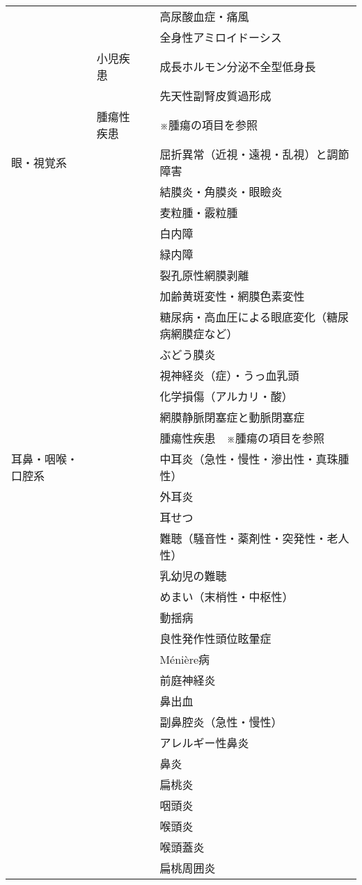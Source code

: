 \begin{xltabular}{\linewidth}{XXXX}
 &  &  & 高尿酸血症・痛風 \\
 &  &  & 全身性アミロイドーシス \\
 & 小児疾患 &  & 成長ホルモン分泌不全型低身長 \\
 &  &  & 先天性副腎皮質過形成 \\
 & 腫瘍性疾患 &  & ※腫瘍の項目を参照 \\
眼・視覚系 &  &  & 屈折異常（近視・遠視・乱視）と調節障害 \\
 &  &  & 結膜炎・角膜炎・眼瞼炎 \\
 &  &  & 麦粒腫・霰粒腫 \\
 &  &  & 白内障 \\
 &  &  & 緑内障 \\
 &  &  & 裂孔原性網膜剥離 \\
 &  &  & 加齢黄斑変性・網膜色素変性 \\
 &  &  & 糖尿病・高血圧による眼底変化（糖尿病網膜症など） \\
 &  &  & ぶどう膜炎 \\
 &  &  & 視神経炎（症）・うっ血乳頭 \\
 &  &  & 化学損傷（アルカリ・酸） \\
 &  &  & 網膜静脈閉塞症と動脈閉塞症 \\
 &  &  & 腫瘍性疾患　※腫瘍の項目を参照 \\
耳鼻・咽喉・口腔系 &  &  & 中耳炎（急性・慢性・滲出性・真珠腫性） \\
 &  &  & 外耳炎 \\
 &  &  & 耳せつ \\
 &  &  & 難聴（騒音性・薬剤性・突発性・老人性） \\
 &  &  & 乳幼児の難聴 \\
 &  &  & めまい（末梢性・中枢性） \\
 &  &  & 動揺病 \\
 &  &  & 良性発作性頭位眩暈症 \\
 &  &  & Ménière病 \\
 &  &  & 前庭神経炎 \\
 &  &  & 鼻出血 \\
 &  &  & 副鼻腔炎（急性・慢性） \\
 &  &  & アレルギー性鼻炎 \\
 &  &  & 鼻炎 \\
 &  &  & 扁桃炎 \\
 &  &  & 咽頭炎 \\
 &  &  & 喉頭炎 \\
 &  &  & 喉頭蓋炎 \\
 &  &  & 扁桃周囲炎 \\

\end{xltabular}
